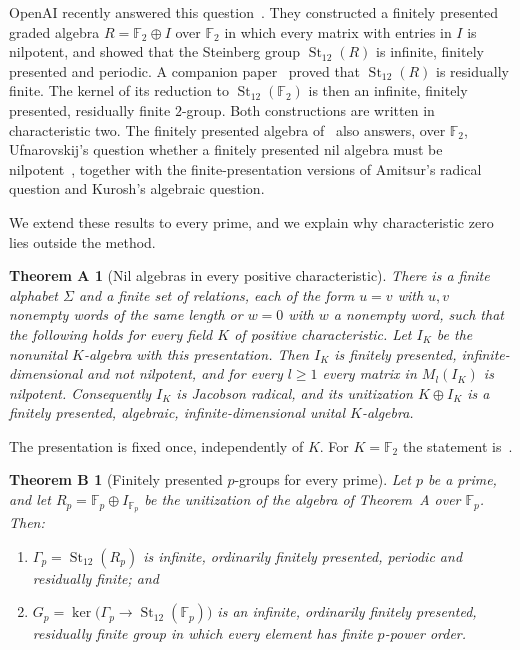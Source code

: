 \documentclass[11pt]{article}
\numberwithin{equation}{section}
\newtheorem*{theoremA}{Theorem A}
\newtheorem*{theoremB}{Theorem B}
\theoremstyle{definition}
\theoremstyle{remark}
\newcommand{\F}{\mathbb F}
\DeclareMathOperator{\St}{St}
\begin{document}
OpenAI recently answered this question~\cite{OAI247periodic}. They constructed a finitely presented graded algebra
$R=\F_2\oplus I$ over $\F_2$ in which every matrix with entries in $I$ is nilpotent, and showed that the Steinberg group
$\St_{12}(R)$ is infinite, finitely presented and periodic. A companion paper~\cite{OAI247rf} proved that $\St_{12}(R)$
is residually finite. The kernel of its reduction to $\St_{12}(\F_2)$ is then an infinite, finitely presented,
residually finite $2$-group. Both constructions are written in characteristic two. The finitely presented algebra
of~\cite{OAI247periodic} also answers, over $\F_2$, Ufnarovskij's question whether a finitely presented nil algebra must
be nilpotent~\cite[Question~8.1]{Smoktunowicz2008}, together with the finite-presentation versions of Amitsur's radical
question and Kurosh's algebraic question.

We extend these results to every prime, and we explain why characteristic zero lies outside the method.

\begin{theoremA}[Nil algebras in every positive characteristic]
There is a finite alphabet $\Sigma$ and a finite set of relations, each of the form $u=v$ with $u,v$ nonempty words of the
same length or $w=0$ with $w$ a nonempty word, such that the following holds for every field $K$ of positive
characteristic. Let $I_K$ be the nonunital $K$-algebra with this presentation. Then $I_K$ is finitely presented,
infinite-dimensional and not nilpotent, and for every $l\geq1$ every matrix in $M_l(I_K)$ is nilpotent. Consequently
$I_K$ is Jacobson radical, and its unitization $K\oplus I_K$ is a finitely presented, algebraic, infinite-dimensional
unital $K$-algebra.
\end{theoremA}

The presentation is fixed once, independently of $K$. For $K=\F_2$ the statement is~\cite{OAI247periodic}.

\begin{theoremB}[Finitely presented $p$-groups for every prime]
Let $p$ be a prime, and let $R_p=\F_p\oplus I_{\F_p}$ be the unitization of the algebra of Theorem~A over $\F_p$. Then:
\begin{enumerate}[label=\textup{(\roman*)}]
\item $\Gamma_p=\St_{12}(R_p)$ is infinite, ordinarily finitely presented, periodic and residually finite; and
\item $G_p=\ker\bigl(\Gamma_p\to\St_{12}(\F_p)\bigr)$ is an infinite, ordinarily finitely presented, residually finite
group in which every element has finite $p$-power order.
\end{enumerate}
\end{theoremB}
\end{document}
